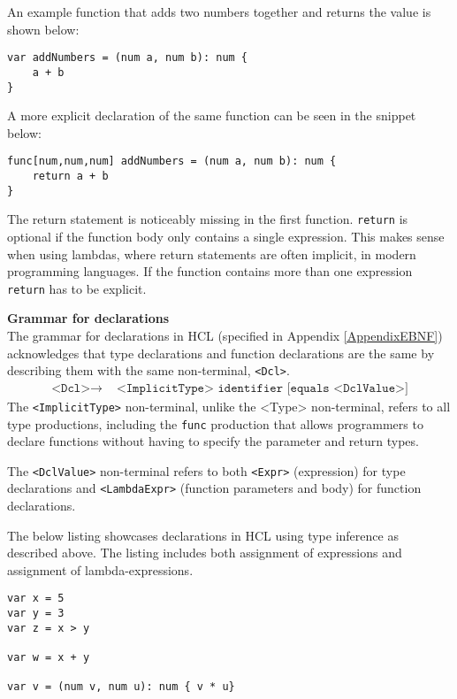 An example function that adds two numbers together and returns the value is shown below:
\begin{lstlisting}[language=HCL,label=lis:addNumbers,firstnumber=1]
var addNumbers = (num a, num b): num {
    a + b
}
\end{lstlisting} 
A more explicit declaration of the same function can be seen in the snippet below:
\begin{lstlisting}[language=HCL,label=lis:hclExplicitTypeDcls,firstnumber=1]
func[num,num,num] addNumbers = (num a, num b): num {
	return a + b
}
\end{lstlisting}

The return statement is noticeably missing in the first function.
\texttt{return} is optional if the function body only contains a single expression. 
This makes sense when using lambdas, where return statements are often implicit, in modern programming languages. 
If the function contains more than one expression \texttt{return} has to be explicit.

\textbf{Grammar for declarations}\\
The grammar for declarations in HCL (specified in Appendix \ref{AppendixEBNF}) acknowledges that type declarations and function declarations are the same by describing them with the same non-terminal, \texttt{<Dcl>}.
\begin{align*}
	\texttt{<Dcl>}\to & \texttt{ <ImplicitType> identifier [equals <DclValue>]}
\end{align*}
The \texttt{<ImplicitType>} non-terminal, unlike the <Type> non-terminal, refers to all type productions, including the \texttt{func} production that allows programmers to declare functions without having to specify the parameter and return types.

The \texttt{<DclValue>} non-terminal refers to both \texttt{<Expr>} (expression) for type declarations and \texttt{<LambdaExpr>} (function parameters and body) for function declarations.

The below listing showcases declarations in HCL using type inference as described above.
The listing includes both assignment of expressions and assignment of lambda-expressions.

\begin{lstlisting}[language=HCL,caption={Implicit type declarations in HCL.
},firstnumber=1]
var x = 5
var y = 3
var z = x > y

var w = x + y

var v = (num v, num u): num { v * u}
\end{lstlisting}

